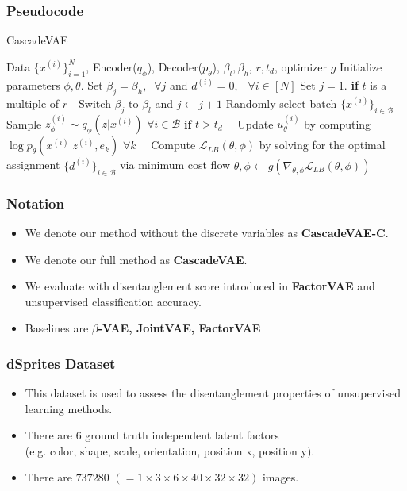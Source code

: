 \documentclass[10pt,mathserif]{beamer}
\newcommand{\algorithmicinput}{\textbf{input}}
\newcommand{\INPUT}{\item[\algorithmicinput]}
\begin{document}
\begin{frame}
\frametitle{Pseudocode}
\begin{algorithm}[H]
\caption{CascadeVAE}
\footnotesize
\begin{algorithmic}[1]
\INPUT Data $\{x^{(i)}\}_{i=1}^N$, Encoder($q_\phi$), Decoder($p_\theta$), $\beta_l, \beta_h$, $r, t_d$, optimizer $g$
\STATE Initialize parameters $\phi, \theta$.
\STATE Set $\beta_j=\beta_h,~$ $\forall j$ and $d^{(i)}=0,$ $~~\forall i\in [N]$
\STATE Set $j=1$.
\STATE \textbf{if} $t$ is a multiple of $r$
\STATE $~~~$Switch $\beta_j$ to $\beta_l$ and $j\leftarrow j+1$
\STATE Randomly select batch $\{x^{(i)}\}_{i \in \mathcal{B}}$
\STATE Sample $z^{(i)}_\phi \sim q_{\phi}(z|x^{(i)})$ $\forall i \in \mathcal{B}$ 
\STATE \textbf{if} $t>t_d$
\STATE $~~~$ Update $u_\theta^{(i)}$ by computing $\log p_\theta(x^{(i)}|z^{(i)}, e_k)$ $\forall k$
\STATE $~~~$ Compute $\mathcal{L}_{LB}(\theta, \phi)$ by solving for the optimal \\
\qquad assignment $\{d^{(i)}\}_{i\in \mathcal{B}}$ via minimum cost flow 
\STATE $\theta, \phi \leftarrow g\left(\nabla_{\theta,\phi} \mathcal{L}_{LB}(\theta,\phi)\right)$
\ENDFOR
\end{algorithmic}
\end{algorithm}
\end{frame}


\begin{frame}
\frametitle{Notation}
\begin{itemize}\itemsep=12pt
\item We denote our method without the discrete variables as \textbf{CascadeVAE-C}.
\item We denote our full method as \textbf{CascadeVAE}. 
\item We evaluate with disentanglement score introduced in \textbf{FactorVAE} and unsupervised classification accuracy.
\item Baselines are \textbf{$\beta$-VAE, JointVAE, FactorVAE}
\end{itemize}
\end{frame}

\begin{frame}
\frametitle{dSprites Dataset}
\begin{itemize}\itemsep=20pt
\item This dataset is used to assess the disentanglement properties of unsupervised learning methods.\pause
\item There are 6 ground truth independent latent factors\\
    (e.g. color, shape, scale, orientation, position x, position y).\pause
\item There are $737280$ $(=1\times3\times6\times40\times32\times32)$ images.
\end{itemize}
\end{frame}
\end{document}
